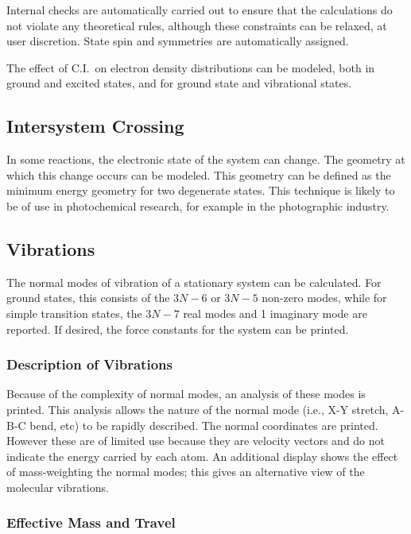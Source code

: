 Internal checks are automatically carried out to ensure that the calculations
do  not violate any theoretical rules, although these constraints can be
relaxed, at  user discretion.  State spin and symmetries are automatically
assigned.

The effect of C.I.\ on electron density distributions can be modeled, both in
ground and excited states, and for ground state and vibrational states.

\subsection{Intersystem Crossing}

In some reactions, the electronic state of the system can change.  The
geometry  at which this change occurs can be modeled.  This geometry can be
defined as  the minimum energy geometry for two degenerate states. This
technique is  likely to be of use in photochemical research, for example in the
photographic  industry.

\subsection{Vibrations}

The normal modes of vibration of a stationary system can be calculated.  For
ground states, this consists of the $3N-6$ or $3N-5$ non-zero modes, while for
simple transition states, the $3N-7$ real modes and 1 imaginary mode are
reported.   If desired, the force constants for the system can be printed.

\subsubsection*{Description of Vibrations}

Because of the complexity of normal modes, an analysis of these modes is
printed.  This analysis allows the nature of the normal mode (i.e., X-Y
stretch,  A-B-C bend, etc) to be rapidly described.  The normal coordinates are
printed. However these are of limited use because they are velocity vectors and
do not  indicate the energy carried by each atom.  An additional display shows
the effect  of mass-weighting the normal modes; this gives an alternative view
of the  molecular vibrations.

\subsubsection*{Effective Mass and Travel}

